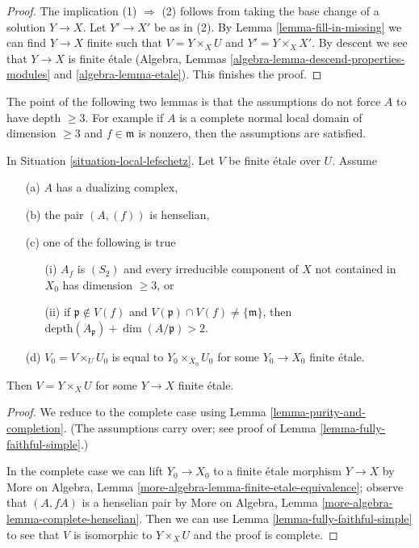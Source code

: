 \begin{proof}
The implication (1) $\Rightarrow$ (2) follows from taking the base change
of a solution $Y \to X$. Let $Y' \to X'$ be as in (2).
By Lemma \ref{lemma-fill-in-missing} we can find $Y \to X$ finite
such that $V = Y \times_X U$ and $Y' = Y \times_X X'$.
By descent we see that $Y \to X$ is finite \'etale
(Algebra, Lemmas \ref{algebra-lemma-descend-properties-modules} and
\ref{algebra-lemma-etale}). This finishes the proof.
\end{proof}

\noindent
The point of the following two lemmas is that the assumptions do not force
$A$ to have depth $\geq 3$. For example if $A$ is a complete normal
local domain of dimension $\geq 3$ and $f \in \mathfrak m$ is nonzero,
then the assumptions are satisfied.

\begin{lemma}
\label{lemma-lift-simple}
In Situation \ref{situation-local-lefschetz}. Let $V$ be finite
\'etale over $U$. Assume
\begin{enumerate}
\item[(a)] $A$ has a dualizing complex,
\item[(b)] the pair $(A, (f))$ is henselian,
\item[(c)] one of the following is true
\begin{enumerate}
\item[(i)] $A_f$ is $(S_2)$ and every irreducible component of $X$
not contained in $X_0$ has dimension $\geq 3$, or
\item[(ii)] if $\mathfrak p \not \in V(f)$ and
$V(\mathfrak p) \cap V(f) \not = \{\mathfrak m\}$, then
$\text{depth}(A_\mathfrak p) + \dim(A/\mathfrak p) > 2$.
\end{enumerate}
\item[(d)] $V_0 = V \times_U U_0$ is equal to $Y_0 \times_{X_0} U_0$
for some $Y_0 \to X_0$ finite \'etale.
\end{enumerate}
Then $V = Y \times_X U$ for some $Y \to X$ finite \'etale.
\end{lemma}

\begin{proof}
We reduce to the complete case using Lemma \ref{lemma-purity-and-completion}.
(The assumptions carry over; see proof of
Lemma \ref{lemma-fully-faithful-simple}.)

\medskip\noindent
In the complete case we can lift $Y_0 \to X_0$ to a finite \'etale
morphism $Y \to X$ by
More on Algebra, Lemma \ref{more-algebra-lemma-finite-etale-equivalence};
observe that $(A, fA)$ is a henselian pair by
More on Algebra, Lemma \ref{more-algebra-lemma-complete-henselian}.
Then we can use Lemma \ref{lemma-fully-faithful-simple}
to see that $V$ is isomorphic to $Y \times_X U$ and
the proof is complete.
\end{proof}

